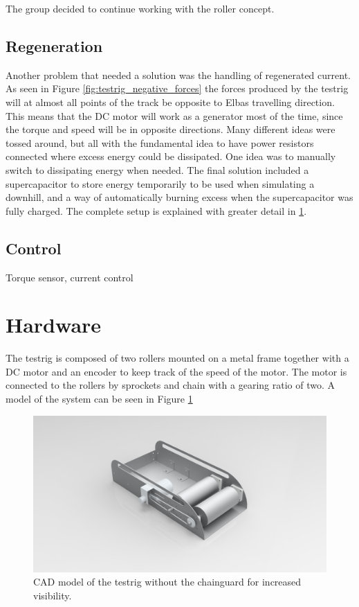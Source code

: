 The group decided to continue working with the roller concept.

\subsection{Regeneration}
Another problem that needed a solution was the handling of regenerated current. As seen in Figure \ref{fig:testrig_negative_forces} the forces produced by the testrig will at almost all points of the track be opposite to Elbas travelling direction. This means that the DC motor will work as a generator most of the time, since the torque and speed will be in opposite directions. Many different ideas were tossed around, but all with the fundamental idea to have power resistors connected where excess energy could be dissipated. One idea was to manually switch to dissipating energy when needed. The final solution included a supercapacitor to store energy temporarily to be used when simulating a downhill, and a way of automatically burning excess when the supercapacitor was fully charged. The complete setup is explained with greater detail in \ref{sec:testrig_hardware}.

\subsection{Control}
Torque sensor, current control

\section{Hardware}\label{sec:testrig_hardware}
The testrig is composed of two rollers mounted on a metal frame together with a
DC motor and an encoder to keep track of the speed
of the motor. The motor is connected to the rollers by sprockets and chain with
a gearing ratio of two. A model of the system can be seen in Figure \ref{fig:testrig_hardware}

\begin{figure}[H]
    \centering
    \includegraphics[width=\textwidth]{./img/testrig_hardware.png}
    \caption{CAD model of the testrig without the chainguard for increased visibility.}
    \label{fig:testrig_hardware}
\end{figure}

